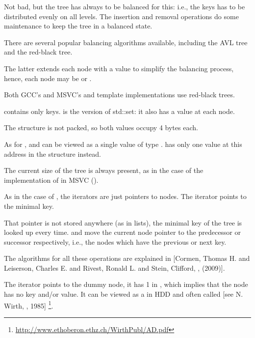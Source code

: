 Not bad, but the tree has always to be balanced for this: i.e., the keys has to be distributed evenly on all levels.
The insertion and removal operations do some maintenance to keep the tree in a balanced state.

There are several popular balancing algorithms available, including the AVL tree and the red-black tree.

The latter extends each node with a  value to simplify the balancing process, hence, 
each node may be  or .

Both GCC's and MSVC's  and  template implementations use red-black trees.

 contains only keys.
 is the  version of std::set: it also has a value at each node.






The structure is not packed, so both \Tchar values occupy 4 bytes each.

As for ,  and  can be viewed as a single value of type .
has only one value at this address in the structure instead.

The current size of the tree is always present, as in the case of the implementation of  in MSVC ().

As in the case of , 
the iterators are just pointers to nodes.
The  iterator points to the minimal key.

That pointer is not stored anywhere (as in lists), the minimal key of the tree is looked up every time.
 and  
move the current node pointer to the predecessor or successor respectively, i.e., the nodes which have the previous or next key.

The algorithms for all these operations are explained in
[Cormen, Thomas H. and Leiserson, Charles E. and Rivest, Ronald L. and Stein, Clifford,
, (2009)].

The  iterator points to the dummy node, it has 1 in , which implies that 
the node has no key and/or value.
It can be viewed as a  in \ac{HDD}
and often called  [see N. Wirth, , 1985]
\footnote{\url{http://www.ethoberon.ethz.ch/WirthPubl/AD.pdf}}.

